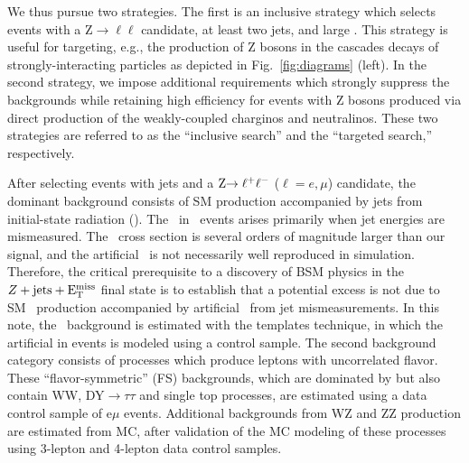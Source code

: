 We thus pursue two strategies. The first is an inclusive strategy which selects events with a Z$\to\ell\ell$ candidate,
at least two jets, and large \MET. This strategy is useful for targeting, e.g., the production of Z bosons in the 
cascades decays of strongly-interacting particles as depicted in Fig.~\ref{fig:diagrams} (left). In the second strategy,
we impose additional requirements which strongly suppress the backgrounds while retaining high efficiency for events
with Z bosons produced via direct production of the weakly-coupled charginos and neutralinos. These two strategies
are referred to as the ``inclusive search'' and the ``targeted search,'' respectively.

After selecting events with jets and a $\Z\to\ell^+\ell^-$ ($\ell=e,\mu$) candidate,
the dominant background consists of SM \Z production accompanied by jets from initial-state radiation (\zjets).
The \MET\ in \zjets\ events arises primarily when jet energies are mismeasured.
The \zjets\ cross section is several orders of magnitude larger
than our signal, and the artificial \MET\ is not necessarily well reproduced in simulation.
Therefore, the critical prerequisite to a discovery of BSM physics in the $Z+\rm{jets}+\rm{E_{T}^{miss}}$ final state is 
to establish that a potential excess is not due to SM \zjets\ production accompanied by artificial 
\MET\ from jet mismeasurements. In this note, the \zjets\ background is estimated with the \MET templates technique,
in which the artificial \MET in \zjets events is modeled using a \gjets control sample.
The second background category consists of processes which produce leptons with uncorrelated flavor. 
These ``flavor-symmetric'' (FS) backgrounds, which are dominated by \ttbar but also contain WW, DY$\to\tau\tau$
and single top processes, are estimated using a data control sample of e$\mu$ events.
Additional backgrounds from WZ and ZZ production are estimated from MC, after validation of the MC modeling
of these processes using 3-lepton and 4-lepton data control samples.

